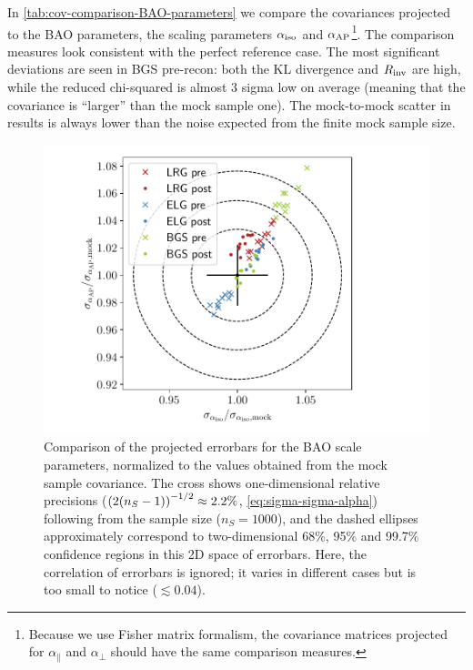 In \cref{tab:cov-comparison-BAO-parameters} we compare the covariances projected to the BAO parameters, the scaling parameters ${\alpha_{\rm iso}}$ and ${\alpha_{\rm AP}}$\footnote{Because we use Fisher matrix formalism, the covariance matrices projected for $\alpha_\parallel$ and $\alpha_\perp$ should have the same comparison measures.}.
The comparison measures look consistent with the perfect reference case.
The most significant deviations are seen in BGS pre-recon: both the KL divergence and $R_{\rm inv}$ are high, while the reduced chi-squared is almost 3 sigma low on average (meaning that the \rascalc{} covariance is ``larger'' than the mock sample one).
The mock-to-mock scatter in \rascalc{} results is always lower than the noise expected from the finite mock sample size.

\begin{figure}[tb]
\centering
\includegraphics[width=\textwidth]{img/DESI-Y1/normalized_errorbars_bao.pdf}
\caption[Comparison of the projected errorbars for the BAO scale parameters for \desimock{}]{Comparison of the projected errorbars for the BAO scale parameters, normalized to the values obtained from the mock sample covariance.
The cross shows one-dimensional relative precisions ($\qty(2\qty(n_S-1))^{-1/2} \approx 2.2\%$, \cref{eq:sigma-sigma-alpha}) following from the \ezmocks{} sample size ($n_S=1000$), and the dashed ellipses approximately correspond to two-dimensional 68\%, 95\% and 99.7\% confidence regions in this 2D space of errorbars.
Here, the correlation of errorbars is ignored; it varies in different cases but is too small to notice ($\lesssim 0.04$).}
\label{fig:BAO-errorbars}
\end{figure}

